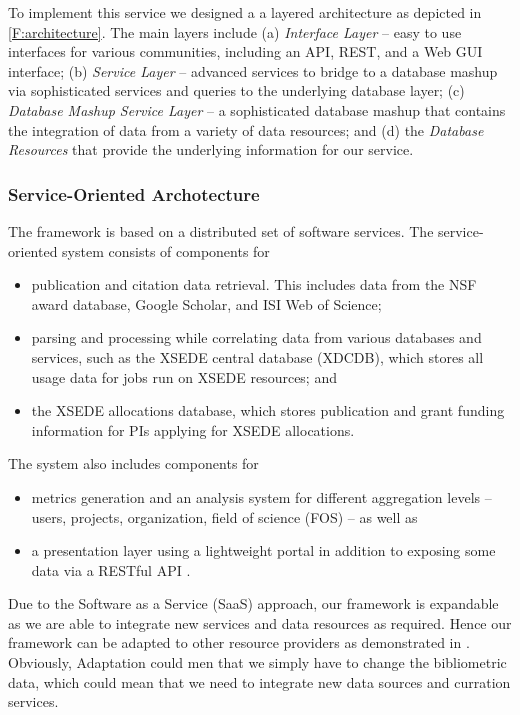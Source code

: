 \documentclass{sig-alternate}
\begin{document}
To implement this service we designed a  a layered architecture as depicted in \ref{F:architecture}.  The main layers include (a) {\em Interface Layer} -- easy to use interfaces for various communities, including an API, REST, and a Web GUI interface; (b) {\em Service Layer} -- advanced services to bridge to a database mashup via sophisticated services and queries to the underlying database layer; (c) {\em Database Mashup Service Layer} -- a sophisticated database mashup that contains the integration of data from a variety of data resources; and (d) the {\em Database Resources} that provide the underlying information for our service. 

\subsubsection{Service-Oriented Archotecture}

The framework is based on a distributed set of software services.  The service-oriented system consists of components for 

\begin{itemize}
\item publication and citation data retrieval. This includes data from the NSF award database, Google Scholar, and ISI Web of Science; 
\item parsing and processing while correlating data from various databases and services, such as the XSEDE central database (XDCDB), which stores all usage data for jobs run on XSEDE resources; and 
\item the XSEDE allocations database, which stores publication and grant funding information for PIs applying for XSEDE allocations.  
\end{itemize}
The system also includes components for 

\begin{itemize}
\item metrics generation and an analysis system for different aggregation levels -- users, projects, organization, field of science (FOS) -- as well as 
\item a presentation layer using a lightweight portal in addition to exposing some data via a RESTful API \cite{las14impact}.
\end{itemize}

Due to the Software as  a Service (SaaS)  approach, our framework is expandable as we are able to integrate new services and data resources as required. Hence our framework can be adapted to other resource providers as demonstrated in \cite{las2015cluster}. Obviously, Adaptation could men that we simply have to change the bibliometric data, which could mean that we need to integrate new data sources and curration services. 
\end{document}
